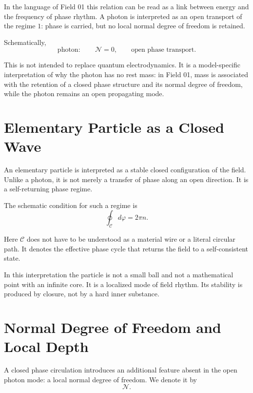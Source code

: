 \documentclass[11pt,a4paper]{article}
\newcommand{\phase}{\varphi}
\newcommand{\normal}{\mathcal{N}}
\newcommand{\contour}{\mathcal{C}}
\begin{document}
In the language of Field 01 this relation can be read as a link between energy and the frequency of phase rhythm. A photon is interpreted as an open transport of the regime $1$: phase is carried, but no local normal degree of freedom is retained.

Schematically,
\begin{equation}
\text{photon}: \qquad \normal = 0, \qquad \text{open phase transport}.
\end{equation}

This is not intended to replace quantum electrodynamics. It is a model-specific interpretation of why the photon has no rest mass: in Field 01, mass is associated with the retention of a closed phase structure and its normal degree of freedom, while the photon remains an open propagating mode.

\section{Elementary Particle as a Closed Wave}

An elementary particle is interpreted as a stable closed configuration of the field. Unlike a photon, it is not merely a transfer of phase along an open direction. It is a self-returning phase regime.

The schematic condition for such a regime is
\begin{equation}
\oint_{\contour} d\phase = 2\pi n.
\end{equation}

Here $\contour$ does not have to be understood as a material wire or a literal circular path. It denotes the effective phase cycle that returns the field to a self-consistent state.

In this interpretation the particle is not a small ball and not a mathematical point with an infinite core. It is a localized mode of field rhythm. Its stability is produced by closure, not by a hard inner substance.

\section{Normal Degree of Freedom and Local Depth}

A closed phase circulation introduces an additional feature absent in the open photon mode: a local normal degree of freedom. We denote it by
\begin{equation}
\normal.
\end{equation}
\end{document}
